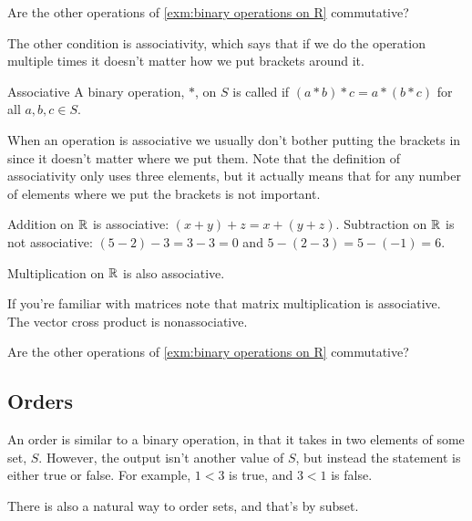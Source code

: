 \documentclass[fleqn]{LectureClass/LectureClass}
\begin{document}
    \begin{problem}{}{}
        Are the other operations of \cref{exm:binary operations on R} commutative?
    \end{problem}
    
    The other condition is associativity, which says that if we do the operation multiple times it doesn't matter how we put brackets around it.
    
    \begin{dfn}{Associative}{}
        A binary operation, \(*\), on \(S\) is called  if \((a * b) * c = a * (b * c)\) for all \(a, b, c \in S\).
    \end{dfn}
    
    When an operation is associative we usually don't bother putting the brackets in since it doesn't matter where we put them.
    Note that the definition of associativity only uses three elements, but it actually means that for any number of elements where we put the brackets is not important.
    
    \begin{exm}{}{}
        Addition on \(\mathbb{R}\) is associative: \((x + y) + z = x + (y + z)\).
        Subtraction on \(\mathbb{R}\) is not associative: \((5 - 2) - 3 = 3 - 3 = 0\) and \(5 - (2 - 3) = 5 - (-1) = 6\).
        
        Multiplication on \(\mathbb{R}\) is also associative.
        
        If you're familiar with matrices note that matrix multiplication is associative.
        The vector cross product is nonassociative.
    \end{exm}
    
    \begin{problem}{}{}
        Are the other operations of \cref{exm:binary operations on R} commutative?
    \end{problem}
    
    \subsection{Orders}
    An order is similar to a binary operation, in that it takes in two elements of some set, \(S\).
    However, the output isn't another value of \(S\), but instead the statement is either true or false.
    For example, \(1 < 3\) is true, and \(3 < 1\) is false.
    
    There is also a natural way to order sets, and that's by subset.
    
\end{document}
